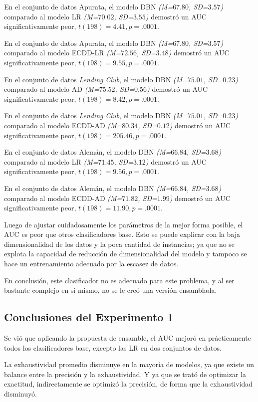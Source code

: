 En el conjunto de datos Apurata, el modelo DBN \textit{(M=$67.80$, SD=$3.57$)} comparado al modelo \ac{LR} \textit{(M=$70.02$, SD=$3.55$)} demostró un \ac{AUC} significativamente peor, $t(198)=4.41, p=.0001$.

En el conjunto de datos Apurata, el modelo DBN \textit{(M=$67.80$, SD=$3.57$)} comparado al modelo ECDD-LR \textit{(M=$72.56$, SD=$3.48$)} demostró un \ac{AUC} significativamente peor, $t(198)=9.55, p=.0001$.

En el conjunto de datos \textit{Lending Club}, el modelo DBN \textit{(M=$75.01$, SD=$0.23$)} comparado al modelo \ac{AD} \textit{(M=$75.52$, SD=$0.56$)} demostró un \ac{AUC} significativamente peor, $t(198)=8.42, p=.0001$.

En el conjunto de datos \textit{Lending Club}, el modelo DBN \textit{(M=$75.01$, SD=$0.23$)} comparado al modelo ECDD-AD \textit{(M=$80.34$, SD=$0.12$)} demostró un \ac{AUC} significativamente peor, $t(198)=205.46, p=.0001$.

En el conjunto de datos Alemán, el modelo DBN \textit{(M=$66.84$, SD=$3.68$)} comparado al modelo \ac{LR} \textit{(M=$71.45$, SD=$3.12$)} demostró un \ac{AUC} significativamente peor, $t(198)=9.56, p=.0001$.

En el conjunto de datos Alemán, el modelo DBN \textit{(M=$66.84$, SD=$3.68$)} comparado al modelo ECDD-AD \textit{(M=$71.82$, SD=$1.99$)} demostró un \ac{AUC} significativamente peor, $t(198)=11.90, p=.0001$.

Luego de ajustar cuidadosamente los parámetros de la mejor forma posible, el \ac{AUC} es peor que otros clasificadores base. Esto se puede explicar con la baja dimensionalidad de los datos y la poca cantidad de instancias; ya que no se explota la capacidad de reducción de dimensionalidad del modelo y tampoco se hace un entrenamiento adecuado por la escasez de datos.

En conclusión, este clasificador no es adecuado para este problema, y al ser bastante complejo en sí mismo, no se le creó una versión ensamblada.


\subsection{Conclusiones del Experimento 1}

Se vió que aplicando la propuesta de ensamble, el \ac{AUC} mejoró en prácticamente todos los clasificadores base, excepto las \ac{LR} en dos conjuntos de datos.

La exhaustividad promedio disminuye en la mayoría de modelos, ya que existe un balance entre la precisión y la exhaustividad. Y ya que se trató de optimizar la exactitud, indirectamente se optimizó la precisión, de forma que la exhaustividad disminuyó.

